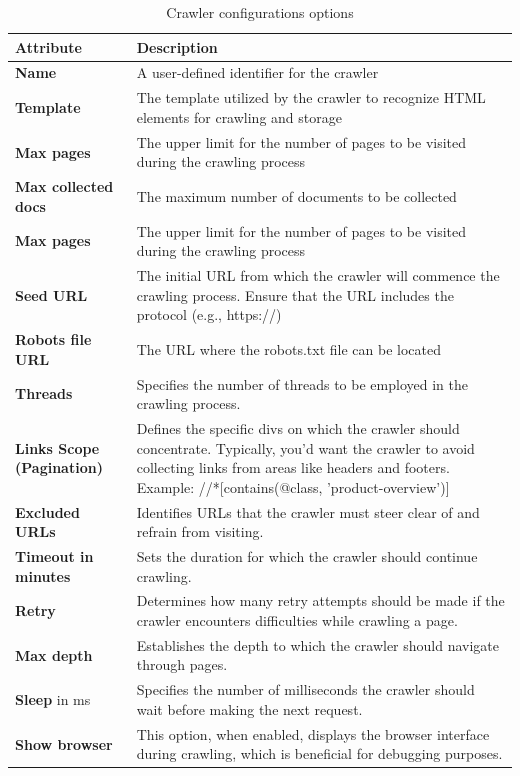 \begin{table}[ht] 
{\footnotesize
\begin{tabular}{ P{2.5cm} ||P{11.1cm}  }      %
 \hline \hline
\textbf{Attribute} & \textbf{Description}\T\B 
\\ 
\hline
\textbf{Name} & A user-defined identifier for the crawler \T\B 
\\ 
\hline
\textbf{Template} & The template utilized by the crawler to recognize HTML elements for crawling and storage \T\B 
\\ 
\hline
\textbf{Max pages} & The upper limit for the number of pages to be visited during the crawling process \T\B 
\\ 
\hline
\textbf{Max collected docs} & The maximum number of documents to be collected \T\B 
\\ 
\hline
\textbf{Max pages} & The upper limit for the number of pages to be visited during the crawling process \T\B 
\\ 
\hline
\textbf{Seed URL} & The initial URL from which the crawler will commence the crawling process. Ensure that the URL includes the protocol (e.g., https://) \T\B 
\\ 
\hline
\textbf{Robots file URL} & The URL where the robots.txt file can be located \T\B 
\\ 
\hline
\textbf{Threads} & Specifies the number of threads to be employed in the crawling process. \T\B 
\\ 
\hline
\textbf{Links Scope (Pagination)} & Defines the specific divs on which the crawler should concentrate. Typically, you'd want the crawler to avoid collecting links from areas like headers and footers. Example: //*[contains(@class, 'product-overview')] \T\B 
\\ 
\hline
\textbf{Excluded URLs} & Identifies URLs that the crawler must steer clear of and refrain from visiting. \T\B 
\\ 
\hline
\textbf{Timeout in minutes} & Sets the duration for which the crawler should continue crawling.\\ 
\hline
\textbf{Retry} & Determines how many retry attempts should be made if the crawler encounters difficulties while crawling a page. \T\B 
\\ 
\hline
\textbf{Max depth} & Establishes the depth to which the crawler should navigate through pages. \T\B 
\\ 
\hline
\textbf{Sleep} in ms & Specifies the number of milliseconds the crawler should wait before making the next request. \T\B 
\\ 
\hline
\textbf{Show browser} & This option, when enabled, displays the browser interface during crawling, which is beneficial for debugging purposes. \T\B 
\\ 
\hline \hline
    \end{tabular}
}
  \captionsetup{justification=centering,margin=2cm}
  \caption{Crawler configurations options}
\end{table}

